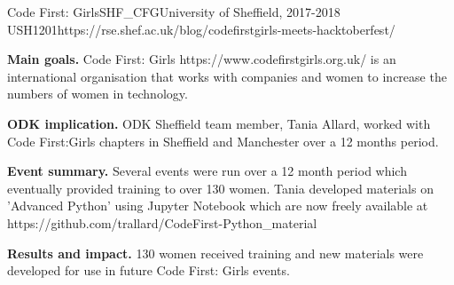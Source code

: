 \begin{event}{Code First: Girls}{SHF_CFG}{University of Sheffield, 2017-2018 }{USH}{120}{1}{https://rse.shef.ac.uk/blog/codefirstgirls-meets-hacktoberfest/}

\textbf{Main goals.} Code First: Girls https://www.codefirstgirls.org.uk/ is an international organisation that works with companies and women to increase the numbers of women in technology.

\textbf{ODK implication.} ODK Sheffield team member, Tania Allard, worked with Code First:Girls chapters in Sheffield and Manchester over a 12 months period.

\textbf{Event summary.} Several events were run over a 12 month period which eventually provided training to over 130 women.  Tania developed materials on 'Advanced Python' using Jupyter Notebook which are now freely available at https://github.com/trallard/CodeFirst-Python_material

\textbf{Results and impact.} 130 women received training and new materials were developed for use in future Code First: Girls events.

\end{event}
